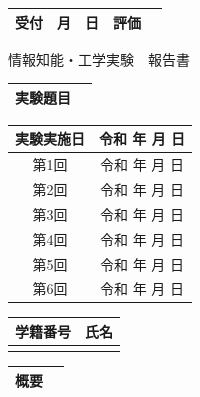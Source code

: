 \documentclass[dvipdfmx]{jsarticle}
\begin{document}
\begin{titlepage}

\begin{flushright}
\begin{tabular}{|c|c|c|c|}
\hline
受付 & 月　日 & 評価 & \;\;\;\;\\
\hline
\end{tabular}
\end{flushright}


\begin{center}
    \vspace{100truept}

    \Huge 情報知能・工学実験　報告書

    \begin{tabular}{ |c|c| } 
    \hline
    実験題目 &  \\ 
    \hline
    \end{tabular}

    \vspace{30truept}

    {\normalsize
    \begin{tabular}{ |c|c| } 
    \hline
    実験実施日 &  令和 年 月 日 \\
    \hline
    第1回 &  令和 年 月 日 \\
    \hline
    第2回 &  令和 年 月 日 \\
    \hline
    第3回 &  令和 年 月 日 \\
    \hline
    第4回 &  令和 年 月 日 \\
    \hline
    第5回 &  令和 年 月 日 \\
    \hline
    第6回 &  令和 年 月 日 \\
    \hline
    \end{tabular}
    }

    \vspace{30truept}

    {\normalsize
    \begin{tabular}{ |c|c| } 
    \hline
    学籍番号 & 氏名 \\ 
    \hline
     &  \\ 
    \hline
    \end{tabular}
    }

    \vspace{30truept}

    {\normalsize
    \begin{tabular}{ |c|c| } 
    \hline
    概要 &  \\ 
    \hline
    \end{tabular}
    }
\end{center}

\end{titlepage}
\end{document}
